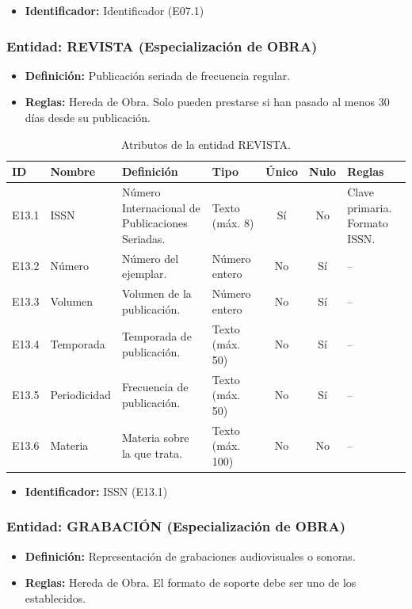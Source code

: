 	\begin{itemize}
		\item\textbf{Identificador:} Identificador (E07.1)
	\end{itemize}
	
	\subsubsection{Entidad: REVISTA (Especialización de OBRA)}
	\begin{itemize}
		\item\textbf{Definición:} Publicación seriada de frecuencia regular.
		\item\textbf{Reglas:} Hereda de Obra. Solo pueden prestarse si han pasado al menos 30 días desde su publicación.
	\end{itemize}
	
	\begin{table}[H]
		\centering
		\caption{Atributos de la entidad REVISTA.}
		\label{tab:dict_revista}
		\small
		\begin{tabularx}{\textwidth}{l l X l c c X}
			\toprule
			\textbf{ID} & \textbf{Nombre} & \textbf{Definición} & \textbf{Tipo} & \textbf{Único} & \textbf{Nulo} & \textbf{Reglas} \\
			\midrule
			E13.1 & ISSN & Número Internacional de Publicaciones Seriadas. & Texto (máx. 8) & Sí & No & Clave primaria. Formato ISSN. \\
			\addlinespace
			E13.2 & Número & Número del ejemplar. & Número entero & No & Sí & -- \\
			\addlinespace
			E13.3 & Volumen & Volumen de la publicación. & Número entero & No & Sí & -- \\
			\addlinespace
			E13.4 & Temporada & Temporada de publicación. & Texto (máx. 50) & No & Sí & -- \\
			\addlinespace
			E13.5 & Periodicidad & Frecuencia de publicación. & Texto (máx. 50) & No & Sí & -- \\
			\addlinespace
			E13.6 & Materia & Materia sobre la que trata. & Texto (máx. 100) & No & No & -- \\
			\bottomrule
		\end{tabularx}
	\end{table}
	
	\begin{itemize}
		\item\textbf{Identificador:} ISSN (E13.1)
	\end{itemize}
	
	\subsubsection{Entidad: GRABACIÓN (Especialización de OBRA)}
	\begin{itemize}
		\item\textbf{Definición:} Representación de grabaciones audiovisuales o sonoras.
		\item\textbf{Reglas:} Hereda de Obra. El formato de soporte debe ser uno de los establecidos.
	\end{itemize}
	
